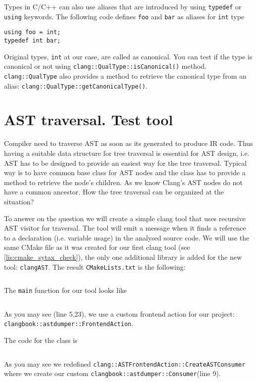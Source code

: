 Types in C/C++ can also use aliases that are introduced by using
\texttt{typedef} or \texttt{using} keywords. The following
code defines \texttt{foo} and \texttt{bar} as aliases for
\texttt{int} type
\begin{verbatim}
using foo = int;
typedef int bar;
\end{verbatim}
Original types, \texttt{int} at our case, are called as canonical. You
can test if the type is canonical or not using
\texttt{clang::QualType::isCanonical()}
method. \texttt{clang::QualType} also provides a method to retrieve the
canonical type from an alias: \texttt{clang::QualType::getCanonicalType()}.

\section{AST traversal. Test tool}
Compiler need to traverse AST as soon as its generated to produce IR code. Thus
having a suitable data structure for tree traversal is essential for AST design,
i.e. AST has to be designed to provide an easiest way for the tree
traversal. Typical way is to have common base class for AST nodes and the class
has to provide a method to retrieve the node's children. As we know Clang's AST
nodes do not have a common ancestor. How the tree traversal can be organized at
the situation?

To answer on the question we will create a simple clang tool that uses recursive
AST visitor for traversal. The tool will emit a message when it finds a
reference to a declaration (i.e. variable usage) in the analysed source code. We
will use the same CMake file as it was 
created for our first clang tool (see \cref{lis:cmake_sytax_check}), the only
one additional library is added for the new tool: \texttt{clangAST}. The result
\texttt{CMakeLists.txt} is the following:
\inputminted[highlightlines={19}, firstline=2,lastline=24]{cmake}{src/part1/ch3_ast/astdumper/CMakeLists.txt}

The \texttt{main} function for our tool looks like
\inputminted[highlightlines={5,23}]{c++}{src/part1/ch3_ast/astdumper/AstDumper.cpp}
As you may see (line 5,23), we use a custom frontend action for our project:
\texttt{clangbook::astdumper::FrontendAction}.

The code for the class is
\inputminted{c++}{src/part1/ch3_ast/astdumper/FrontendAction.hpp}
As you may see we redefined
\texttt{clang::ASTFrontendAction::CreateASTConsumer} 
where we create our custom \texttt{clangbook::astdumper::Consumer}(line 9).

